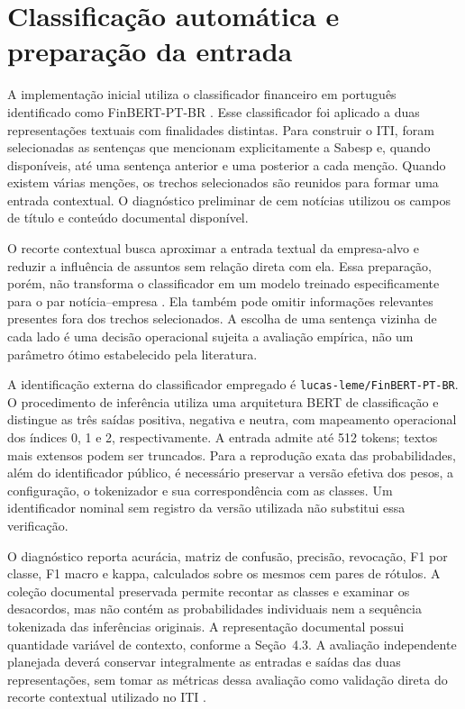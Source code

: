 \section{Classificação automática e preparação da entrada}
\label{sec:classificador-operacional}

A implementação inicial utiliza o classificador financeiro em português identificado como FinBERT-PT-BR \cite{santos2023finbert}. Esse classificador foi aplicado a duas representações textuais com finalidades distintas. Para construir o ITI, foram selecionadas as sentenças que mencionam explicitamente a Sabesp e, quando disponíveis, até uma sentença anterior e uma posterior a cada menção. Quando existem várias menções, os trechos selecionados são reunidos para formar uma entrada contextual. O diagnóstico preliminar de cem notícias utilizou os campos de título e conteúdo documental disponível.

O recorte contextual busca aproximar a entrada textual da empresa-alvo e reduzir a influência de assuntos sem relação direta com ela. Essa preparação, porém, não transforma o classificador em um modelo treinado especificamente para o par notícia--empresa \cite{cortis2017semeval5,sinha2022sentfin,tang2023finentity}. Ela também pode omitir informações relevantes presentes fora dos trechos selecionados. A escolha de uma sentença vizinha de cada lado é uma decisão operacional sujeita a avaliação empírica, não um parâmetro ótimo estabelecido pela literatura.

A identificação externa do classificador empregado é \texttt{lucas-leme/FinBERT-PT-BR}. O procedimento de inferência utiliza uma arquitetura BERT de classificação e distingue as três saídas positiva, negativa e neutra, com mapeamento operacional dos índices 0, 1 e 2, respectivamente. A entrada admite até 512 tokens; textos mais extensos podem ser truncados. Para a reprodução exata das probabilidades, além do identificador público, é necessário preservar a versão efetiva dos pesos, a configuração, o tokenizador e sua correspondência com as classes. Um identificador nominal sem registro da versão utilizada não substitui essa verificação.

O diagnóstico reporta acurácia, matriz de confusão, precisão, revocação, F1 por classe, F1 macro e kappa, calculados sobre os mesmos cem pares de rótulos. A coleção documental preservada permite recontar as classes e examinar os desacordos, mas não contém as probabilidades individuais nem a sequência tokenizada das inferências originais. A representação documental possui quantidade variável de contexto, conforme a Seção~4.3. A avaliação independente planejada deverá conservar integralmente as entradas e saídas das duas representações, sem tomar as métricas dessa avaliação como validação direta do recorte contextual utilizado no ITI \cite{artstein2008agreement}.

